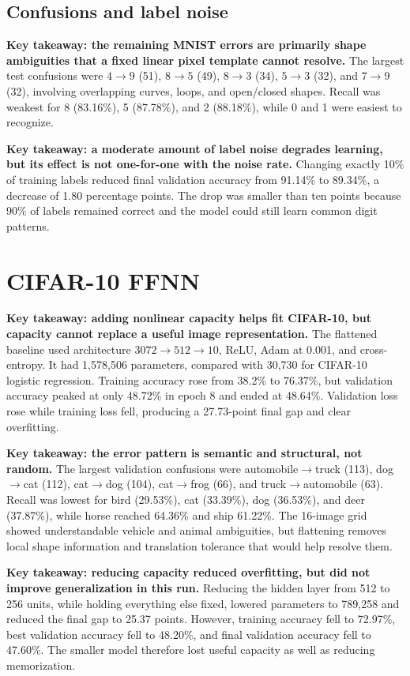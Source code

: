 \documentclass[11pt]{article}
\begin{document}
\subsection{Confusions and label noise}
\textbf{Key takeaway: the remaining MNIST errors are primarily shape ambiguities that a fixed linear pixel template cannot resolve.} The largest test confusions were $4\rightarrow9$ (51), $8\rightarrow5$ (49), $8\rightarrow3$ (34), $5\rightarrow3$ (32), and $7\rightarrow9$ (32), involving overlapping curves, loops, and open/closed shapes. Recall was weakest for 8 (83.16\%), 5 (87.78\%), and 2 (88.18\%), while 0 and 1 were easiest to recognize.

\textbf{Key takeaway: a moderate amount of label noise degrades learning, but its effect is not one-for-one with the noise rate.} Changing exactly 10\% of training labels reduced final validation accuracy from 91.14\% to 89.34\%, a decrease of 1.80 percentage points. The drop was smaller than ten points because 90\% of labels remained correct and the model could still learn common digit patterns.

\section{CIFAR-10 FFNN}
\textbf{Key takeaway: adding nonlinear capacity helps fit CIFAR-10, but capacity cannot replace a useful image representation.} The flattened baseline used architecture $3072\rightarrow512\rightarrow10$, ReLU, Adam at 0.001, and cross-entropy. It had 1,578,506 parameters, compared with 30,730 for CIFAR-10 logistic regression. Training accuracy rose from 38.2\% to 76.37\%, but validation accuracy peaked at only 48.72\% in epoch 8 and ended at 48.64\%. Validation loss rose while training loss fell, producing a 27.73-point final gap and clear overfitting.

\textbf{Key takeaway: the error pattern is semantic and structural, not random.} The largest validation confusions were automobile$\rightarrow$truck (113), dog$\rightarrow$cat (112), cat$\rightarrow$dog (104), cat$\rightarrow$frog (66), and truck$\rightarrow$automobile (63). Recall was lowest for bird (29.53\%), cat (33.39\%), dog (36.53\%), and deer (37.87\%), while horse reached 64.36\% and ship 61.22\%. The 16-image grid showed understandable vehicle and animal ambiguities, but flattening removes local shape information and translation tolerance that would help resolve them.

\textbf{Key takeaway: reducing capacity reduced overfitting, but did not improve generalization in this run.} Reducing the hidden layer from 512 to 256 units, while holding everything else fixed, lowered parameters to 789,258 and reduced the final gap to 25.37 points. However, training accuracy fell to 72.97\%, best validation accuracy fell to 48.20\%, and final validation accuracy fell to 47.60\%. The smaller model therefore lost useful capacity as well as reducing memorization.
\end{document}
